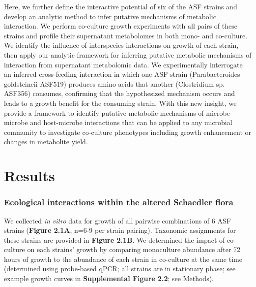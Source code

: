\documentclass[11pt,twocolumn,notitlepage,openany,twoside]{book}
\begin{document}
\begin{refsection}
Here, we further define the interactive potential of six of the ASF strains and develop an analytic method to infer putative mechanisms of metabolic interaction. We perform co-culture growth experiments with all pairs of these strains and profile their supernatant metabolomes in both mono- and co-culture. We identify the influence of interspecies interactions on growth of each strain, then apply our analytic framework for inferring putative metabolic mechanisms of interaction from supernatant metabolomic data. We experimentally interrogate an inferred cross-feeding interaction in which one ASF strain (Parabacteroides goldsteineii ASF519) produces amino acids that another (Clostridium sp. ASF356) consumes, confirming that the hypothesized mechanism occurs and leads to a growth benefit for the consuming strain. With this new insight, we provide a framework to identify putative metabolic mechanisms of microbe-microbe and host-microbe interactions that can be applied to any microbial community to investigate co-culture phenotypes including growth enhancement or changes in metabolite yield.

\section{Results}
\subsubsection{Ecological interactions within the altered Schaedler flora}

We collected \textit{in vitro} data for growth of all pairwise combinations of 6 ASF strains (\textbf{Figure 2.1A}, n=6-9 per strain pairing). Taxonomic assignments for these strains are provided in \textbf{Figure 2.1B}. We determined the impact of co-culture on each strains’ growth by comparing monoculture abundance after 72 hours of growth to the abundance of each strain in co-culture at the same time (determined using probe-based qPCR; all strains are in stationary phase; see example growth curves in \textbf{Supplemental Figure 2.2}; see Methods).


\end{refsection}
\end{document}
